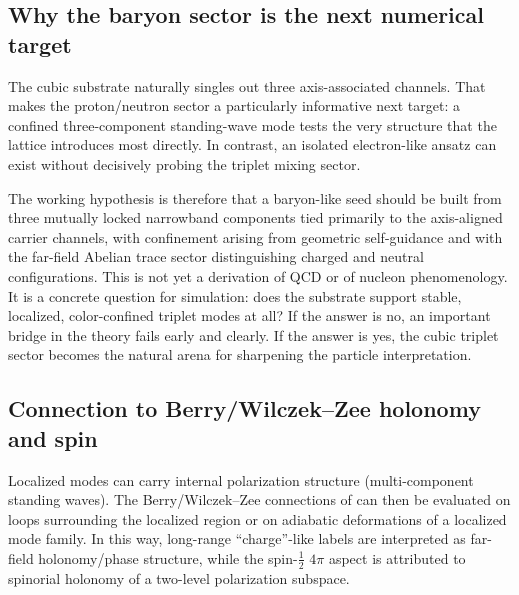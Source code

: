 \subsection{Why the baryon sector is the next numerical target}

The cubic substrate naturally singles out three axis-associated channels.
That makes the proton/neutron sector a particularly informative next target: a confined three-component standing-wave
mode tests the very structure that the lattice introduces most directly.
In contrast, an isolated electron-like ansatz can exist without decisively probing the triplet mixing sector.

The working hypothesis is therefore that a baryon-like seed should be built from three mutually locked narrowband
components tied primarily to the axis-aligned carrier channels, with confinement arising from geometric self-guidance
and with the far-field Abelian trace sector distinguishing charged and neutral configurations.
This is not yet a derivation of QCD or of nucleon phenomenology.
It is a concrete question for simulation: does the substrate support stable, localized, color-confined triplet modes at
all?
If the answer is no, an important bridge in the theory fails early and clearly.
If the answer is yes, the cubic triplet sector becomes the natural arena for sharpening the particle interpretation.

\subsection{Connection to Berry/Wilczek--Zee holonomy and spin}

Localized modes can carry internal polarization structure (multi-component standing waves).
The Berry/Wilczek--Zee connections of  can then be evaluated on loops surrounding the localized
region or on adiabatic deformations of a localized mode family.
In this way, long-range ``charge''-like labels are interpreted as far-field holonomy/phase structure, while the
spin-$\tfrac12$ $4\pi$ aspect is attributed to spinorial holonomy of a two-level polarization subspace.
